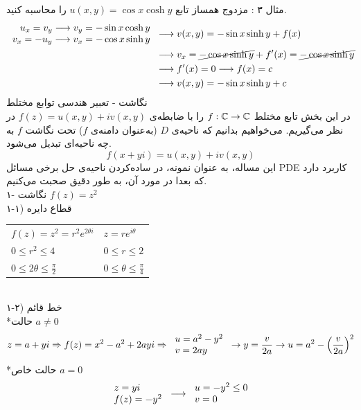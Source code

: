 مثال ۳ : مزدوج همساز تابع
$u(x,y)=\cos x\cosh y$
را محاسبه کنید.
\[\begin{aligned}
	\begin{tabular}{r}
		$u_x=v_y\longrightarrow v_y=-\sin x\cosh y$
		\\
		$v_x=-u_y\longrightarrow v_x=-\cos x\sinh y$
	\end{tabular}& \longrightarrow
	v(x,y)=-\sin x\sinh y+f(x)
	\\ & \longrightarrow
	v_x=\cancel{-\cos x\sinh y}+f^\prime(x)=\cancel{-\cos x\sinh y}
	\\ & \longrightarrow
	f^\prime(x)=0\longrightarrow f(x)=c
	\\ & \longrightarrow
	v(x,y)=-\sin x\sinh y+c
\end{aligned}\]
نگاشت - تعبیر هندسی توابع مختلط\\
در این بخش تابع مختلط
$f:\mathbb{C}\to\mathbb{C}$
را با ضابطه‌ی
$f(z)=u(x,y)+iv(x,y)$
در نظر می‌گیریم. می‌خواهیم بدانیم که ناحیه‌ی
$D$
(به‌عنوان دامنه‌ی $f$) تحت نگاشت
$f$
به چه ناحیه‌ای تبدیل می‌شود.
\[
f(x+yi)=u(x,y)+iv(x,y)
\]
این مساله، به عنوان نمونه، در ساده‌کردن ناحیه‌ی حل برخی مسائل PDE کاربرد دارد که بعدا در مورد آن، به طور دقیق صحبت می‌کنیم.\\
۱- نگاشت
$f(z)=z^2$\\
۱-۱) قطاع دایره\\
\begin{tabular}{ll}
	$f(z)=z^2=r^2e^{2\theta i}$
	&
	$z=re^{i\theta}$
	\\
	$0\le r^2\le4$
	&
	$0\le r\le2$
	\\
	$0\le2\theta\le\frac\pi2$
	&
	$0\le\theta\le\frac\pi4$
\end{tabular}
\\
۱-۲) خط قائم\\
*حالت
$a\ne0$
\[\begin{aligned}
z=a+yi\Rightarrow f(z)=x^2-a^2+2ayi \Rightarrow
\begin{tabular}{l}
	$u=a^2-y^2$
	\\
	$v=2ay$
\end{tabular}\rightarrow y=\frac v{2a}
\rightarrow u=a^2-\pr{\frac v{2a}}^2
\end{aligned}\]
*حالت خاص
$a=0$
\[
\begin{tabular}{l}
	$z=yi$
	\\
	$f(z)=-y^2$
\end{tabular}\longrightarrow
\begin{tabular}{l}
	$u=-y^2\le0$
	\\
	$v=0$
\end{tabular}
\]
